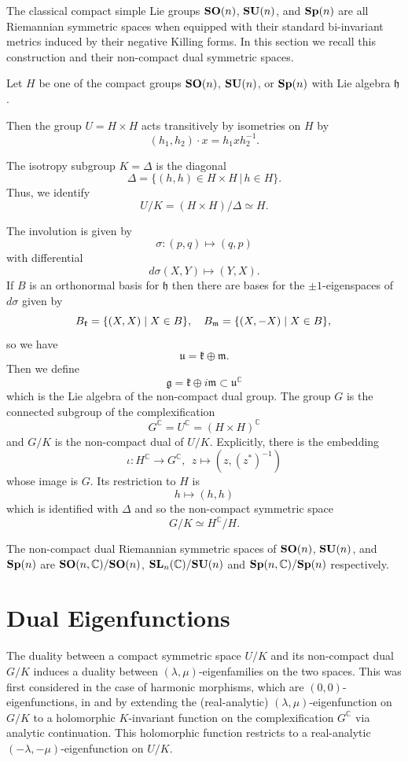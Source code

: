 \documentclass[11pt,reqno]{amsart}
\theoremstyle{plain}
\theoremstyle{definition}
\numberwithin{equation}{section}
\def \cn{{\mathbb C}}
\def \g{\mathfrak{g}}
\def \h{\mathfrak{h}}
\def \k{\mathfrak{k}}
\def \m{\mathfrak{m}}
\def \SLC#1{\text{\bf SL}_{#1}(\cn)}
\def \SO#1{\text{\bf SO}(#1)}
\def \SOC#1{\text{\bf SO}(#1,\cn)}
\def \SU#1{\text{\bf SU}(#1)}
\def \Sp#1{\text{\bf Sp}(#1)}
\def \SpC#1{\text{\bf Sp}(#1,\cn)}
\numberwithin{equation}{section}
\begin{document}
The classical compact simple Lie groups $\SO n$, $\SU n$, and $\Sp n$ are all Riemannian symmetric spaces when equipped with their standard bi-invariant metrics induced by their negative Killing forms. In this section we recall this construction and their non-compact dual symmetric spaces.

 Let $H$ be one of the compact groups $\SO n$, $\SU n$, or $\Sp n$ with Lie algebra $\h$.
 
 Then the group $U=H\times H$ acts transitively by isometries on $H$ by
 $$(h_1,h_2) \cdot x = h_1 x h_2^{-1}.$$
 
 
The isotropy subgroup $K =\Delta$ is the diagonal 
$$\Delta =\{(h,h)\in H\times H\, |\, h\in H\}.$$
Thus, we identify $$ U/K = (H \times H)/\Delta \simeq H.$$

The involution is given by
$$ \sigma: (p,q) \mapsto (q,p)$$
with differential
$$ d\sigma (X,Y) \mapsto (Y,X).$$
If $B$ is an orthonormal basis for $\h $ then there are bases for the $\pm 1$-eigenspaces of $d\sigma$ given by
$$B_\k = \{ (X,X) \mid X \in B\}, \ \ \ B_{\m} = \{ (X,-X) \mid X \in B\},\\$$ 
so we have 
$$ \mathfrak u = \k \oplus \m.$$
Then we define
$$ \g = \k \oplus i \m \subset \mathfrak u^\cn $$
which is the Lie algebra of the non-compact dual group. The group $G$ is the connected subgroup of the complexification 
$$ G^\cn = U^\cn = (H \times H)^\cn$$ and $G/K$ is the non-compact dual of $U/K$. Explicitly, there is the embedding
$$ \iota : H^\cn \to G^\cn, \ \ z \mapsto (z,(z^*)^{-1})$$
whose image is $G$. Its restriction to $H$ is 
$$ h \mapsto (h,h)$$
which is identified with $\Delta$ and so the non-compact symmetric space
$$ G/K \simeq H^\cn/H.$$

The non-compact dual Riemannian symmetric spaces of $\SO n$, $\SU n$, and $\Sp n$ are $\SOC n/\SO n$, $\SLC n/\SU n$ and $\SpC n/\Sp n$ respectively.


\section{Dual Eigenfunctions}
\label{section-dual-eigenfunction}
The duality between a compact symmetric space $U/K$ and its non-compact dual $G/K$ induces a duality between $(\lambda,\mu)$-eigenfamilies on the two spaces. This was first considered in the case of harmonic morphisms, which are $(0,0)$-eigenfunctions, in \cite{Gud-Sve-1} and \cite{Gud-Sve-2} by extending the (real-analytic) $(\lambda,\mu)$-eigenfunction on $G/K$ to a holomorphic $K$-invariant function on the complexification $G^{\cn}$ via analytic continuation. This holomorphic function restricts to a real-analytic $(-\lambda,-\mu)$-eigenfunction on $U/K$.
\end{document}
